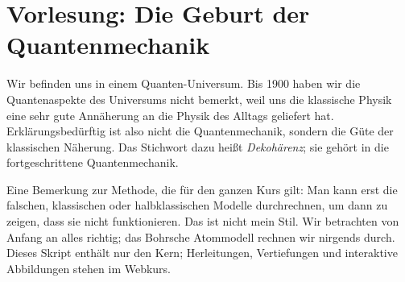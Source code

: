 
\section{Vorlesung: Die Geburt der Quantenmechanik}
Wir befinden uns in einem Quanten-Universum. Bis 1900 haben wir die Quantenaspekte des Universums nicht bemerkt, weil uns die klassische Physik eine sehr gute Annäherung an die Physik des Alltags geliefert hat. Erklärungsbedürftig ist also nicht die Quantenmechanik, sondern die Güte der klassischen Näherung. Das Stichwort dazu heißt \emph{Dekohärenz}; sie gehört in die fortgeschrittene Quantenmechanik.

Eine Bemerkung zur Methode, die für den ganzen Kurs gilt: Man kann erst die falschen, klassischen oder halbklassischen Modelle durchrechnen, um dann zu zeigen, dass sie nicht funktionieren. Das ist nicht mein Stil. Wir betrachten von Anfang an alles richtig; das Bohrsche Atommodell rechnen wir nirgends durch. Dieses Skript enthält nur den Kern; Herleitungen, Vertiefungen und interaktive Abbildungen stehen im Webkurs.

